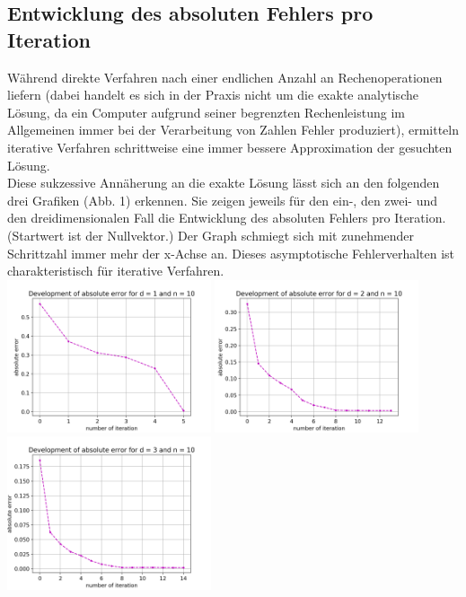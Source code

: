 \documentclass{scrartcl}
\begin{document}
\subsection{Entwicklung des absoluten Fehlers pro Iteration}
Während direkte Verfahren nach einer endlichen Anzahl an Rechenoperationen \grqq{} liefern (dabei handelt es sich in der Praxis nicht um die exakte analytische Lösung, da ein Computer aufgrund seiner begrenzten Rechenleistung im Allgemeinen immer bei der Verarbeitung von Zahlen Fehler produziert), ermitteln iterative Verfahren schrittweise eine immer bessere Approximation der gesuchten Lösung. \\
Diese sukzessive Annäherung an die exakte Lösung lässt sich an den folgenden drei Grafiken (Abb. 1) erkennen.
Sie zeigen jeweils für den ein-, den zwei- und den dreidimensionalen Fall die Entwicklung des absoluten Fehlers pro Iteration.
(Startwert ist der Nullvektor.)
Der Graph schmiegt sich mit zunehmender Schrittzahl immer mehr der x-Achse an.
Dieses asymptotische Fehlerverhalten ist charakteristisch für iterative Verfahren. \\

{
  \centering
    \includegraphics[width=0.45\textwidth]{Grafiken/iterates_d1_n10}
    \includegraphics[width=0.45\textwidth]{Grafiken/iterates_d2_n10}
    \includegraphics[width=0.45\textwidth]{Grafiken/iterates_d3_n10}
    \vspace{-0.2cm}
}
\vspace{0.5cm}
\end{document}
